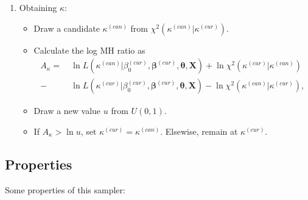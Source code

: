 \documentclass{article}\usepackage[]{graphicx}\usepackage[]{color}
\begin{document}
\begin{enumerate}
\item Obtaining $\kappa$:
\begin{itemize}
\item Draw a candidate $\kappa^{(can)}$ from $\chi^2(\kappa^{(can)} \vert \kappa^{(cur)})$.
\item Calculate the log MH ratio as
\begin{align*}
A_\kappa = ~& \ln L \left( \kappa^{(can)} \vert \beta_0^{(cur)}, \boldsymbol\beta^{(cur)}, \boldsymbol\theta, \boldsymbol{X} \right) + \ln \chi^2 \left(\kappa^{(cur)} \vert \kappa^{(can)}\right) \\
- & \ln L \left( \kappa^{(cur)} \vert \beta_0^{(cur)}, \boldsymbol\beta^{(cur)}, \boldsymbol\theta, \boldsymbol{X} \right) - \ln \chi^2 \left(\kappa^{(can)} \vert \kappa^{(cur)}\right),
\end{align*}
\item Draw a new value $u$ from $U(0,1)$.
\item If $A_\kappa > \ln u $, set $\kappa^{(cur)} = \kappa^{(can)}$. Elsewise, remain at $\kappa^{(cur)}$.
\end{itemize}

\end{enumerate}


\subsection{Properties}

Some properties of this sampler:
\end{document}
